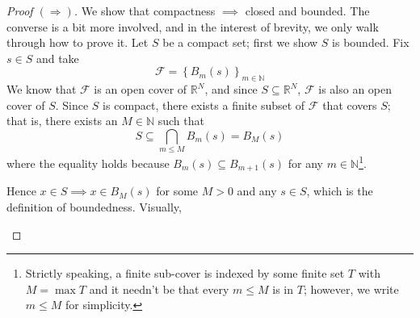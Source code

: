 \documentclass{article}
\newcommand{\R}{\mathbb{R}}
\newcommand{\N}{\mathbb{N}}
\theoremstyle{mythm}
\theoremstyle{mydef}
\begin{document}
\begin{proof}[\textit{Proof} $(\Rightarrow)$]
    We show that compactness $\implies$ closed and bounded. The converse is a bit more involved, and in the interest of brevity, we only walk through how to prove it. Let $S$ be a compact set; first we show $S$ is bounded. Fix $s\in S$ and take 
    \begin{equation*}
        \mathcal{F} = \left\{ B_m(s) \right\}_{m\in\N}
    \end{equation*}
    We know that $\mathcal{F}$ is an open cover of $\R^N$, and since $S\subseteq \R^N$, $\mathcal{F}$ is also an open cover of $S$. Since $S$ is compact, there exists a finite subset of $\mathcal{F}$ that covers $S$; that is, there exists an $M\in\N$ such that 
    \begin{equation*}
        S\subseteq \bigcap_{m\leq M} B_m(s) = B_M(s)
    \end{equation*}
    where the equality holds because $B_m(s) \subseteq B_{m+1}(s)$ for any $m\in \N$\footnote{Strictly speaking, a finite  sub-cover is indexed by some finite set $T$ with $M = \max T$ and it needn't be that every $m \le M$ is in $T$; however, we write $m \le M$ for simplicity.}. 

    Hence $x\in S \implies x\in B_M(s)$ for some $M>0$ and any $s\in S$, which is the definition of boundedness. Visually, 
    \begin{figure}[H]
    \centering
  \end{figure}
  

\end{proof}
\end{document}
